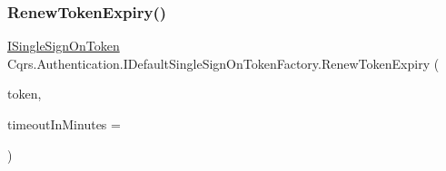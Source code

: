 \subsubsection{\texorpdfstring{Renew\+Token\+Expiry()}{RenewTokenExpiry()}}
{\footnotesize\ttfamily \hyperlink{interfaceCqrs_1_1Authentication_1_1ISingleSignOnToken}{I\+Single\+Sign\+On\+Token} Cqrs.\+Authentication.\+I\+Default\+Single\+Sign\+On\+Token\+Factory.\+Renew\+Token\+Expiry (\begin{DoxyParamCaption}\item[{\hyperlink{interfaceCqrs_1_1Authentication_1_1ISingleSignOnToken}{I\+Single\+Sign\+On\+Token}}]{token,  }\item[{int}]{timeout\+In\+Minutes = {} }\end{DoxyParamCaption})}

